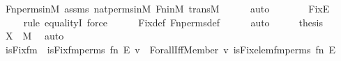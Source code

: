 \begin{isabellebody}
\ Fn{\isacharunderscore}{\kern0pt}perms{\isacharunderscore}{\kern0pt}in{\isacharunderscore}{\kern0pt}M\ assms\ nat{\isacharunderscore}{\kern0pt}perms{\isacharunderscore}{\kern0pt}in{\isacharunderscore}{\kern0pt}M\ Fn{\isacharunderscore}{\kern0pt}in{\isacharunderscore}{\kern0pt}M\ transM\isanewline
\ \ \ \ \isamarkupfalse%
\ auto\isanewline
\ \ \isamarkupfalse%
\ \isamarkupfalse%
\ {\isachardoublequoteopen}{\isachardot}{\kern0pt}{\isachardot}{\kern0pt}{\isachardot}{\kern0pt}\ {\isacharequal}{\kern0pt}\ Fix{\isacharparenleft}{\kern0pt}E{\isacharparenright}{\kern0pt}{\isachardoublequoteclose}\ \isanewline
\ \ \ \ \isamarkupfalse%
{\isacharparenleft}{\kern0pt}rule\ equalityI{\isacharcomma}{\kern0pt}\ force{\isacharparenright}{\kern0pt}\isanewline
\ \ \ \ \isamarkupfalse%
\ Fix{\isacharunderscore}{\kern0pt}def\ Fn{\isacharunderscore}{\kern0pt}perms{\isacharunderscore}{\kern0pt}def\isanewline
\ \ \ \ \isamarkupfalse%
\ auto\isanewline
\ \ \isamarkupfalse%
\ \isamarkupfalse%
\ {\isacharquery}{\kern0pt}thesis\ \isamarkupfalse%
\ {\isacartoucheopen}X\ {\isasymin}\ M{\isacartoucheclose}\ \isamarkupfalse%
\ auto\isanewline
{}\isamarkupfalse%
%
\endisatagproof
{\isafoldproof}%
%
\isadelimproof
\isanewline
%
\endisadelimproof
\isanewline
{}\isamarkupfalse%
\ is{\isacharunderscore}{\kern0pt}Fix{\isacharunderscore}{\kern0pt}fm\ \ {\isachardoublequoteopen}is{\isacharunderscore}{\kern0pt}Fix{\isacharunderscore}{\kern0pt}fm{\isacharparenleft}{\kern0pt}perms{\isacharcomma}{\kern0pt}\ fn{\isacharcomma}{\kern0pt}\ E{\isacharcomma}{\kern0pt}\ v{\isacharparenright}{\kern0pt}\ {\isasymequiv}\ Forall{\isacharparenleft}{\kern0pt}Iff{\isacharparenleft}{\kern0pt}Member{\isacharparenleft}{\kern0pt}{}{\isacharcomma}{\kern0pt}\ v{\isacharhash}{\kern0pt}{\isacharplus}{\kern0pt}{}{\isacharparenright}{\kern0pt}{\isacharcomma}{\kern0pt}\ is{\isacharunderscore}{\kern0pt}Fix{\isacharunderscore}{\kern0pt}elem{\isacharunderscore}{\kern0pt}fm{\isacharparenleft}{\kern0pt}perms{\isacharhash}{\kern0pt}{\isacharplus}{\kern0pt}{}{\isacharcomma}{\kern0pt}\ fn{\isacharhash}{\kern0pt}{\isacharplus}{\kern0pt}{}{\isacharcomma}{\kern0pt}\ E{\isacharhash}{\kern0pt}{\isacharplus}{\kern0pt}{}{\isacharcomma}{\kern0pt}\ {}{\isacharparenright}{\kern0pt}{\isacharparenright}{\kern0pt}{\isacharparenright}{\kern0pt}{\isachardoublequoteclose}\ \isanewline

\end{isabellebody}
